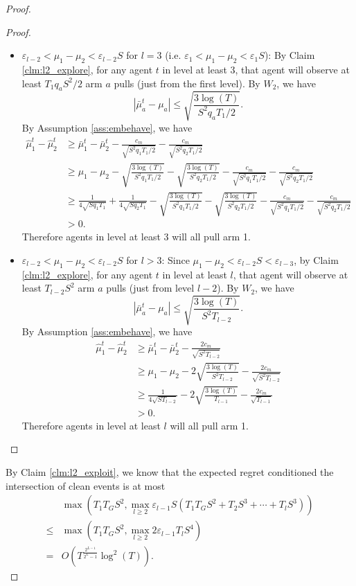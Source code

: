 \begin{proof}
\begin{proof}
\begin{itemize}
\item $\varepsilon_{l-2} < \mu_1 - \mu_2 < \varepsilon_{l-2}S$ for $l =3$ (i.e. $\varepsilon_1 < \mu_1 - \mu_2 < \varepsilon_1S$): By Claim \ref{clm:l2_explore}, for any agent $t$ in level at least $3$, that agent will observe at least $T_1q_aS^2/2$ arm $a$ pulls (just from the first level). By $W_2$, we have
\[
|\bar{\mu}_a^t - \mu_a| \leq \sqrt{\frac{3\log(T)}{S^2q_aT_1/2}}.
\]
By Assumption \ref{ass:embehave}, we have
\begin{align*}
\hat{\mu}_1^t - \hat{\mu}_2^t &\geq \bar{\mu}_1^t - \bar{\mu}_2^t - \frac{c_m}{\sqrt{S^2q_1T_1/2}}-\frac{c_m}{\sqrt{S^2q_2T_1/2}}  \\
&\geq \mu_1 -\mu_2 -  \sqrt{\frac{3\log(T)}{S^2q_1T_1/2}}- \sqrt{\frac{3\log(T)}{S^2q_2T_1/2}}- \frac{c_m}{\sqrt{S^2q_1T_1/2}}-\frac{c_m}{\sqrt{S^2q_2T_1/2}}  \\
&\geq\frac{1}{4\sqrt{Sq_1T_1}} + \frac{1}{4\sqrt{Sq_2T_1}}  -  \sqrt{\frac{3\log(T)}{S^2q_1T_1/2}}- \sqrt{\frac{3\log(T)}{S^2q_2T_1/2}}- \frac{c_m}{\sqrt{S^2q_1T_1/2}}-\frac{c_m}{\sqrt{S^2q_2T_1/2}}  \\
&>0.
\end{align*}
Therefore agents in level at least 3 will all pull arm 1. 

\item $\varepsilon_{l-2} < \mu_1 - \mu_2 < \varepsilon_{l-2}S$ for $l >3$: Since $\mu_1-\mu_2 < \varepsilon_{l-2}S < \varepsilon_{l-3}$, by Claim \ref{clm:l2_explore}, for any agent $t$ in level at least $l$, that agent will observe at least $T_{l-2}S^2$ arm $a$ pulls (just from level $l-2$). By $W_2$, we have
\[
|\bar{\mu}_a^t - \mu_a| \leq \sqrt{\frac{3\log(T)}{S^2T_{l-2}}}.
\]
By Assumption \ref{ass:embehave}, we have
\begin{align*}
\hat{\mu}_1^t - \hat{\mu}_2^t &\geq \bar{\mu}_1^t - \bar{\mu}_2^t - \frac{2c_m}{\sqrt{S^2T_{l-2}}} \\
&\geq \mu_1 -\mu_2 - 2 \sqrt{\frac{3\log(T)}{S^2T_{l-2}}}- \frac{2c_m}{\sqrt{S^2T_{l-2}}} \\
&\geq\frac{1}{4\sqrt{ST_{l-2}}} -  2 \sqrt{\frac{3\log(T)}{T_{l-1}}}- \frac{2c_m}{\sqrt{T_{l-1}}} \\
&>0.
\end{align*}
Therefore agents in level at least $l$ will all pull arm 1. 
\end{itemize}
\end{proof}

By Claim \ref{clm:l2_exploit}, we know that the expected regret conditioned the intersection of clean events is at most 
\begin{align*}
&\max\left( T_1T_GS^2 , \max_{l \geq 2} \varepsilon_{l-1}S(T_1T_GS^2 + T_2 S^3 + \cdots + T_lS^3)\right) \\
\leq & \max\left( T_1T_GS^2 , \max_{l \geq 2} 2 \varepsilon_{l-1} T_l S^4 \right)\\
= &O(T^{\frac{2^{L-1}}{2^L-1}} \log^2(T)).
\end{align*}
\end{proof}
